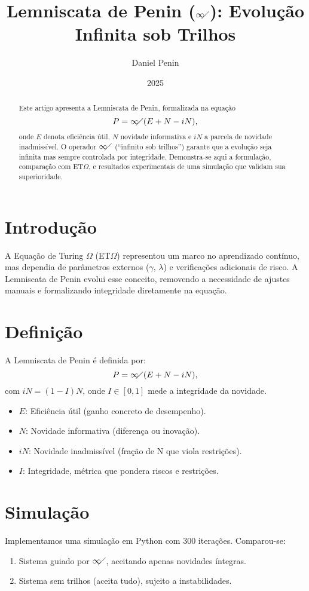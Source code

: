\documentclass{article}
\title{Lemniscata de Penin ($\infty\!\!\diagup$): Evolução Infinita sob Trilhos}
\author{Daniel Penin}
\date{2025}
\begin{document}
\maketitle

\begin{abstract}
Este artigo apresenta a Lemniscata de Penin, formalizada na equação
\[ P = \infty\!\!\diagup(E + N - iN), \]
onde $E$ denota eficiência útil, $N$ novidade informativa e $iN$ a parcela de novidade inadmissível.
O operador $\infty\!\!\diagup$ (``infinito sob trilhos'') garante que a evolução seja infinita mas
sempre controlada por integridade. Demonstra-se aqui a formulação, comparação com ET$\Omega$,
e resultados experimentais de uma simulação que validam sua superioridade.
\end{abstract}

\section{Introdução}
A Equação de Turing $\Omega$ (ET$\Omega$) representou um marco no aprendizado contínuo, mas dependia de parâmetros
externos ($\gamma$, $\lambda$) e verificações adicionais de risco. A Lemniscata de Penin evolui esse conceito,
removendo a necessidade de ajustes manuais e formalizando integridade diretamente na equação.

\section{Definição}
A Lemniscata de Penin é definida por:
\[ P = \infty\!\!\diagup(E + N - iN), \]
com $iN = (1 - I)N$, onde $I \in [0,1]$ mede a integridade da novidade.
\begin{itemize}
\item $E$: Eficiência útil (ganho concreto de desempenho).
\item $N$: Novidade informativa (diferença ou inovação).
\item $iN$: Novidade inadmissível (fração de N que viola restrições).
\item $I$: Integridade, métrica que pondera riscos e restrições.
\end{itemize}

\section{Simulação}
Implementamos uma simulação em Python com 300 iterações. Comparou-se:
\begin{enumerate}
\item Sistema guiado por $\infty\!\!\diagup$, aceitando apenas novidades íntegras.
\item Sistema sem trilhos (aceita tudo), sujeito a instabilidades.
\end{enumerate}
\end{document}
